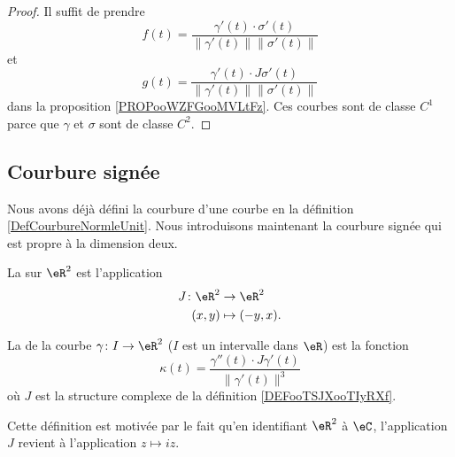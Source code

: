\begin{proof}
    Il suffit de prendre
    \begin{equation}
        f(t)=\frac{ \gamma'(t)\cdot\sigma'(t) }{ \| \gamma'(t) \|\| \sigma'(t) \| }
    \end{equation}
    et
    \begin{equation}
        g(t)=\frac{ \gamma'(t)\cdot J\sigma'(t) }{ \| \gamma'(t) \|\| \sigma'(t) \| }
    \end{equation}
    dans la proposition \ref{PROPooWZFGooMVLtFz}. Ces courbes sont de classe \( C^1\) parce que \( \gamma\) et \( \sigma\) sont de classe \( C^2\).
\end{proof}

\subsection{Courbure signée}

Nous avons déjà défini la courbure d'une courbe en la définition \ref{DefCourbureNormleUnit}. Nous introduisons maintenant la courbure signée qui est propre à la dimension deux.

\begin{definition}      \label{DEFooTSJXooTIyRXf}
    La  sur \( \eR^2\) est l'application
    \begin{equation}
        \begin{aligned}
            J\colon \eR^2&\to \eR^2 \\
            (x,y)&\mapsto (-y,x). 
        \end{aligned}
    \end{equation}
\end{definition}

\begin{definition}      \label{DEFooJFWEooXcIVUs}
    La  de la courbe \( \gamma\colon I\to \eR^2\) (\( I\) est un intervalle dans \( \eR\)) est la fonction
    \begin{equation}        \label{EQooWOUQooXrVzGx}
        \kappa(t)=\frac{ \gamma''(t)\cdot J\gamma'(t) }{ \| \gamma'(t) \|^3 }
    \end{equation}
    où \( J\) est la structure complexe de la définition \ref{DEFooTSJXooTIyRXf}.
\end{definition}
Cette définition est motivée par le fait qu'en identifiant \( \eR^2\) à \( \eC\), l'application \( J\) revient à l'application \( z\mapsto iz\).

